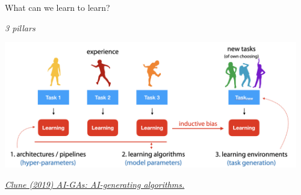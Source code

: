 \begin{frame}{What can we learn to learn?}
\centerline{\textit{3 pillars}}
\centering\includegraphics[height=5.5cm]{image/imgnew2.png}

\vspace{0.7cm}
\raggedright{\footnotesize{\textit{
\href{https://arxiv.org/abs/1905.10985}{Clune (2019) AI-GAs: AI-generating algorithms.}}
}}
\end{frame}

